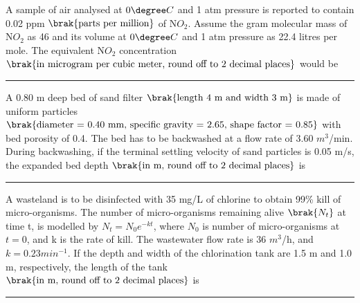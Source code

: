 \item A sample of air analysed at $0\degree C$ and 1 atm pressure is reported to contain 0.02 ppm $\brak{\text{parts per million}}$ of N$O_2$. Assume the gram molecular mass of N$O_2$ as 46 and its volume at $0\degree C$ and 1 atm pressure as 22.4 litres per mole. The equivalent N$O_2$ concentration $\brak{\text{in microgram per cubic meter, round off to 2 decimal places}}$ would be \rule{1cm}{0.4pt}
\item A 0.80 m deep bed of sand filter $\brak{\text{length 4 m and width 3 m}}$ is made of uniform particles $\brak{\text{diameter = 0.40 mm, specific gravity = 2.65, shape factor = 0.85}}$ with bed porosity of 0.4. The bed has to be backwashed at a flow rate of 3.60 $m^3$/min. During backwashing, if the terminal settling velocity of sand particles is 0.05 m/s, the expanded bed depth $\brak{\text{in m, round off to 2 decimal places}}$ is \rule{1cm}{0.4pt}
\item A wasteland is to be disinfected with 35 mg/L of chlorine to obtain 99\% kill of micro-organisms. The number of micro-organisms remaining alive $\brak{N_t}$ at time t, is modelled by $N_t = N_0e^{-kt}$, where $N_0$ is number of micro-organisms at $t = 0$, and k is the rate of kill. The wastewater flow rate is 36 $m^3$/h, and $k = 0.23 min^{-1}$. If the depth and width of the chlorination tank are 1.5 m and 1.0 m, respectively, the length of the tank $\brak{\text{in m, round off to 2 decimal places}}$ is \rule{1cm}{0.4pt}
